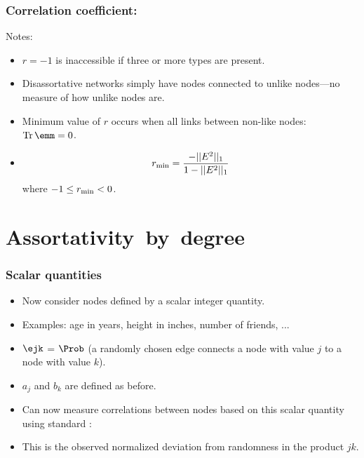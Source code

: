 \begin{frame}
  \frametitle{Correlation coefficient:}

  \begin{block}{Notes:}
  \begin{itemize}
  \item<1->
    $r=-1$ is inaccessible if three or more types are present.
  \item<2->
    Disassortative networks
    simply have nodes connected to unlike nodes---no measure
    of how unlike nodes are.
  \item<3->
    Minimum value of $r$ occurs when all links between
    non-like nodes: $\rm{Tr}\, \emm = 0$.
  \item<4->
    $$
    r_{\rm min}
    =
    \frac{
      - || E^2 ||_1
    }
    {
      1 - || E^2 ||_1
    }
    $$
    where $-1 \le r_{\rm min} < 0$.
  \end{itemize}
  \end{block}

\end{frame}

\section{Assortativity\ by\ degree}

\begin{frame}
  \frametitle{Scalar quantities}

  \begin{itemize}
  \item<1->
    Now consider nodes defined by a scalar integer quantity.
  \item<2->
    Examples: age in years, height in inches, number of friends, ...
  \item<3->
    $\ejk$ = $\Prob$ (a randomly chosen edge connects a node with
    value $j$ to a node with value $k$).
  \item<4->
    $a_{j}$ and $b_{k}$ are defined as before.
  \item<5->
    Can now measure correlations between nodes based 
    on this scalar quantity using standard 
    :
    \item<7->
      This is the observed normalized deviation from randomness
      in the product $jk$.
    \end{itemize}

\end{frame}

